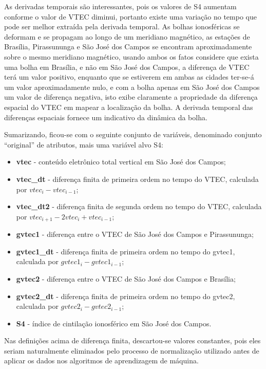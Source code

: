 As derivadas temporais são interessantes, pois os valores de S4 aumentam conforme o valor de VTEC diminui, portanto existe uma variação no tempo que pode ser melhor extraída pela derivada temporal. As bolhas ionosféricas se deformam e se propagam ao longo de um meridiano magnético, as estações de Brasília, Pirassununga e São José dos Campos se encontram aproximadamente sobre o mesmo meridiano magnético, usando ambos os fatos considere que exista uma bolha em Brasília, e não em São José dos Campos, a diferença de VTEC terá um valor positivo, enquanto que se estiverem em ambas as cidades ter-se-á um valor aproximadamente nulo, e com a bolha apenas em São José dos Campos um valor de diferença negativa, isto exibe claramente a propriedade da diferença espacial do VTEC em mapear a localização da bolha. A derivada temporal das diferenças espaciais fornece um indicativo da dinâmica da bolha.

Sumarizando, ficou-se com o seguinte conjunto de variáveis, denominado conjunto ``original'' de atributos, mais uma variável alvo S4:

\begin{itemize}
\item {\bf vtec} - conteúdo eletrônico total vertical em São José dos Campos;
\item {\bf vtec\_dt} - diferença finita de primeira ordem no tempo do VTEC, calculada por $vtec_i-vtec_{i-1}$;
\item {\bf vtec\_dt2} - diferença finita de segunda ordem no tempo do VTEC, calculada por $vtec_{i+1}-2vtec_i+vtec_{i-1}$;
\item {\bf gvtec1} - diferença entre o VTEC de São José dos Campos e Pirassununga;
\item {\bf gvtec1\_dt} - diferença finita de primeira ordem no tempo do gvtec1, calculada por $gvtec1_i-gvtec1_{i-1}$;
\item {\bf gvtec2} - diferença entre o VTEC de São José dos Campos e Brasília;
\item {\bf gvtec2\_dt} - diferença finita de primeira ordem no tempo do gvtec2, calculada por $gvtec2_i-gvtec2_{i-1}$;
\item {\bf S4} - índice de cintilação ionosférico em São José dos Campos.
\end{itemize}

Nas definições acima de diferença finita, descartou-se valores constantes, pois eles seriam naturalmente eliminados pelo processo de normalização utilizado antes de aplicar os dados nos algoritmos de aprendizagem de máquina. 

